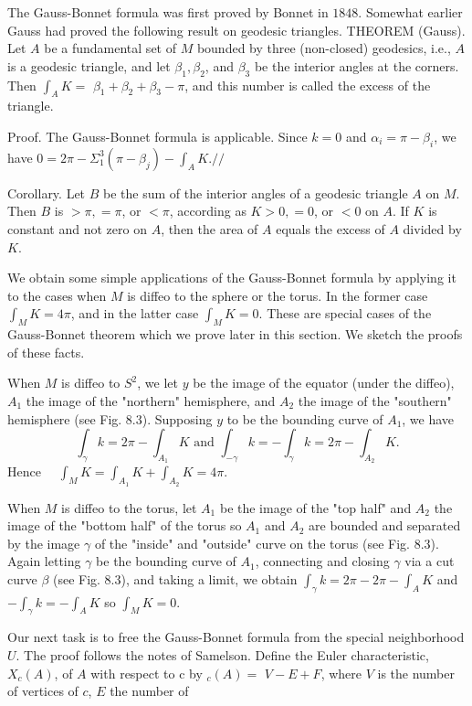 \documentclass[10pt]{article}
\begin{document}
The Gauss-Bonnet formula was first proved by Bonnet in $1848 .$ Somewhat earlier Gauss had proved the following result on geodesic triangles. THEOREM (Gauss). Let $A$ be a fundamental set of $M$ bounded by three (non-closed) geodesics, i.e., $A$ is a geodesic triangle, and let $\beta_{1}, \beta_{2}$, and $\beta_{3}$ be the interior angles at the corners. Then $\int_{A} K=$ $\beta_{1}+\beta_{2}+\beta_{3}-\pi$, and this number is called the excess of the triangle.

Proof. The Gauss-Bonnet formula is applicable. Since $k=0$ and $\alpha_{i}=\pi-\beta_{i}$, we have $0=2 \pi-\Sigma_{1}^{3}\left(\pi-\beta_{j}\right)-\int_{A} K . / /$

Corollary. Let $B$ be the sum of the interior angles of a geodesic triangle $A$ on $M$. Then $B$ is $>\pi,=\pi$, or $<\pi$, according as $K>0,=0$, or $<0$ on $A$. If $K$ is constant and not zero on $A$, then the area of $A$ equals the excess of $A$ divided by $K$.

We obtain some simple applications of the Gauss-Bonnet formula by applying it to the cases when $M$ is diffeo to the sphere or the torus. In the former case $\int_{M} K=4 \pi$, and in the latter case $\int_{M} K=0$. These are special cases of the Gauss-Bonnet theorem which we prove later in this section. We sketch the proofs of these facts.

When $M$ is diffeo to $S^{2}$, we let $y$ be the image of the equator (under the diffeo), $A_{1}$ the image of the "northern" hemisphere, and $A_{2}$ the image of the "southern" hemisphere (see Fig. 8.3). Supposing $y$ to be the bounding curve of $A_{1}$, we have
$$
\int_{\gamma} k=2 \pi-\int_{A_{1}} K \text { and } \int_{-\gamma} k=-\int_{\gamma} k=2 \pi-\int_{A_{2}} K .
$$
Hence $\quad \int_{M} K=\int_{A_{1}} K+\int_{A_{2}} K=4 \pi$.

When $M$ is diffeo to the torus, let $A_{1}$ be the image of the "top half" and $A_{2}$ the image of the "bottom half" of the torus so $A_{1}$ and $A_{2}$ are bounded and separated by the image $\gamma$ of the "inside" and "outside" curve on the torus (see Fig. 8.3). Again letting $\gamma$ be the bounding curve of $A_{1}$, connecting and closing $\gamma$ via a cut curve $\beta$ (see Fig. 8.3), and taking a limit, we obtain $\int_{\gamma} k=2 \pi-2 \pi-\int_{A} K$ and $-\int_{\gamma} k=-\int_{A} K$ so $\int_{M} K=0$.

Our next task is to free the Gauss-Bonnet formula from the special neighborhood $U$. The proof follows the notes of Samelson. Define the Euler characteristic, $X_{c}(A)$, of $A$ with respect to c by ${ }_{c}(A)=$ $V-E+F$, where $V$ is the number of vertices of $c$, $E$ the number of\\
\end{document}
